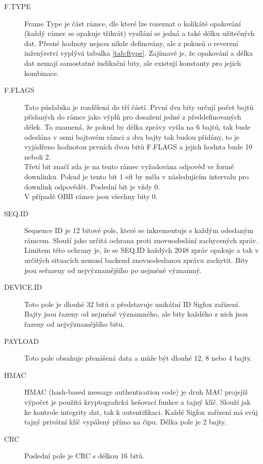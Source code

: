 \documentclass{ctuthesis}
\begin{document}
\begin{description}
\item[F.TYPE]
Frame Type je část rámce, dle které lze rozeznat o kolikáté opakování (každý rámec se opakuje třikrát) vysílání se jedná a také délku užitečných dat. Přesné hodnoty nejsou nikde definovány, ale z pokusů o reverzní inženýrství  \cite{sigfoxprotocol} vyplývá tabulka \ref{tab:ftype}. Zajímavé je, že opakování a délka dat nemají samostatné indikační bity, ale existují konstanty pro jejich kombinace.
\item[F.FLAGS]
Tato půslabika je rozdělená do tří částí. První dva bity určují počet bajtů přidaných do rámce jako výplň pro dosažení jedné z předdefinovaných délek. To znamená, že pokud by délka zprávy vyšla na 6 bajtů, tak bude odeslána v osmi bajtovém rámci a dva bajty tak budou přidány, to je vyjádřeno hodnotou prvních dvou bitů F.FLAGS a jejich hodnta bude 10 neboli 2.\\
Třetí bit značí zda je na tento rámec vyžadována odpověď ve formě downlinku. Pokud je tento bit 1 síť by měla v následujícím intervalu pro downlink odpovědět. Poslední bit je vždy 0.\\
V případě OBB rámce jsou všechny bity 0.
\item[SEQ.ID]
Sequence ID je 12 bitové pole, které se inkrementuje s každým odeslaným rámcem. Slouží jako určitá ochrana proti znovuodeslání zachycených zpráv. Limitem této ochrany je, že se SEQ.ID každých 2048 zpráv opakuje a tak v určitých situacích nemusí backend znovuodeslanou zprávu zachytit. Bity jsou seřazeny od nejvýznamějšího po nejméně významný.
\item[DEVICE.ID]
Toto pole je dlouhé 32 bitů a představuje unikátní ID Sigfox zařízení. Bajty jsou řazeny od nejméně významného, ale bity každého z nich jsou řazeny od nejvýznamějšího bitu.
\item[PAYLOAD]
Toto pole obsahuje přenášená data a může být dlouhé 12, 8 nebo 4 bajty.
\item[HMAC]
HMAC (hash-based message authentication code) je druh MAC projejíž výpočet je použitá kryptografická hešovací funkce a tajný klíč. Slouží jak ke kontrole integrity dat, tak k autentifikaci. Každé Sigfox zařízení má svůj tajný privátní klíč vypálený přímo na čipu. Délka pole je 2 bajty.
\item[CRC]
Poslední pole je CRC s délkou 16 bitů.
\end{description}
\end{document}
